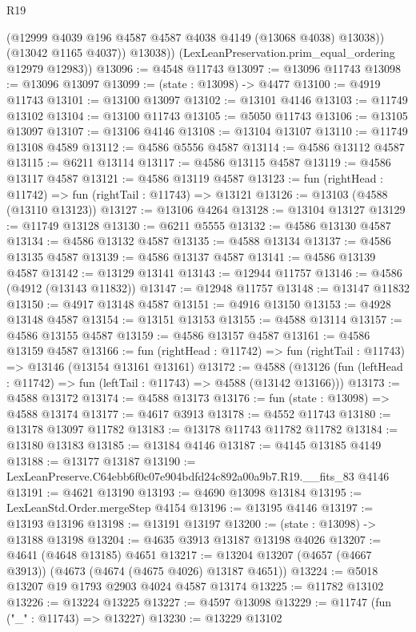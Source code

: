 \begin{lexlean}{R19}
\begin{coremodule}
              (@12999 @4039 @196 @4587 @4587 @4038 @4149 (@13068 @4038) @13038))
            (@13042 @1165 @4037))
          @13038))
      (LexLeanPreservation.prim_equal_ordering @12979 @12983))
@13096 := @4548 @11743
@13097 := @13096 @11743
@13098 := @13096 @13097
@13099 := (state : @13098) -> @4477
@13100 := @4919 @11743
@13101 := @13100 @13097
@13102 := @13101 @4146
@13103 := @11749 @13102
@13104 := @13100 @11743
@13105 := @5050 @11743
@13106 := @13105 @13097
@13107 := @13106 @4146
@13108 := @13104 @13107
@13110 := @11749 @13108 @4589
@13112 := @4586 @5556 @4587
@13114 := @4586 @13112 @4587
@13115 := @6211 @13114
@13117 := @4586 @13115 @4587
@13119 := @4586 @13117 @4587
@13121 := @4586 @13119 @4587
@13123 := fun (rightHead : @11742) => fun (rightTail : @11743) => @13121
@13126 := @13103 (@4588 (@13110 @13123))
@13127 := @13106 @4264
@13128 := @13104 @13127
@13129 := @11749 @13128
@13130 := @6211 @5555
@13132 := @4586 @13130 @4587
@13134 := @4586 @13132 @4587
@13135 := @4588 @13134
@13137 := @4586 @13135 @4587
@13139 := @4586 @13137 @4587
@13141 := @4586 @13139 @4587
@13142 := @13129 @13141
@13143 := @12944 @11757
@13146 := @4586 (@4912 (@13143 @11832))
@13147 := @12948 @11757
@13148 := @13147 @11832
@13150 := @4917 @13148 @4587
@13151 := @4916 @13150
@13153 := @4928 @13148 @4587
@13154 := @13151 @13153
@13155 := @4588 @13114
@13157 := @4586 @13155 @4587
@13159 := @4586 @13157 @4587
@13161 := @4586 @13159 @4587
@13166 := fun (rightHead : @11742) => fun (rightTail : @11743) => @13146 (@13154 @13161 @13161)
@13172 := @4588
    (@13126 (fun (leftHead : @11742) => fun (leftTail : @11743) => @4588 (@13142 @13166)))
@13173 := @4588 @13172
@13174 := @4588 @13173
@13176 := fun (state : @13098) => @4588 @13174
@13177 := @4617 @3913
@13178 := @4552 @11743
@13180 := @13178 @13097 @11782
@13183 := @13178 @11743 @11782 @11782
@13184 := @13180 @13183
@13185 := @13184 @4146
@13187 := @4145 @13185 @4149
@13188 := @13177 @13187
@13190 := LexLeanPreserve.C64ebb6f0c07e904bdfd24c892a00a9b7.R19.__fits_83 @4146
@13191 := @4621 @13190
@13193 := @4690 @13098 @13184
@13195 := LexLeanStd.Order.mergeStep @4154
@13196 := @13195 @4146
@13197 := @13193 @13196
@13198 := @13191 @13197
@13200 := (state : @13098) -> @13188 @13198
@13204 := @4635 @3913 @13187 @13198 @4026
@13207 := @4641 (@4648 @13185) @4651
@13217 := @13204 @13207 (@4657 (@4667 @3913)) (@4673 (@4674 (@4675 @4026) @13187 @4651))
@13224 := @5018 @13207 @19 @1793 @2903 @4024 @4587 @13174
@13225 := @11782 @13102
@13226 := @13224 @13225
@13227 := @4597 @13098
@13229 := @11747 (fun ("_" : @11743) => @13227)
@13230 := @13229 @13102

\end{coremodule}
\end{lexlean}
